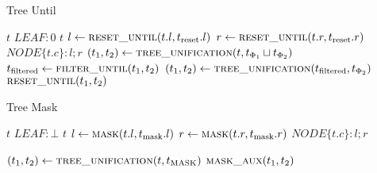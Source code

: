 \documentclass[11pt,a4paper,titlepage]{article}
\begin{document}
\begin{algorithm}                      
    \caption{Tree Until}         
    \label{alg:tree_until}       
    \begin{algorithmic}
                \State \Return $t$
                \State \Return $LEAF: 0$
                \State \Return $t$
            \Else
                \State $l \gets \Call{reset\_until}{t.l, t_{\text{reset}}.l}$
                \State $r \gets \Call{reset\_until}{t.r, t_{\text{reset}}.r}$
                \State \Return $NODE\{t.c \}: l ; r$
            \EndIf 
        \EndFunction
            \State $(t_1, t_2) \gets \Call{tree\_unification}{t, t_{\Phi_1} \sqcup t_{\Phi_2}}$
            \State $t_{\text{filtered}} \gets \Call{filter\_until}{t_1, t_2}$
            \State $(t_1, t_2) \gets \Call{tree\_unification}{t_{\text{filtered}}, t_{\Phi_2}}$
            \State \Return $\Call{reset\_until}{t_1, t_2}$
        \EndFunction
\end{algorithmic}
\end{algorithm}

\begin{algorithm}                      
    \caption{Tree Mask}         
    \label{alg:tree_mask}       
    \begin{algorithmic}

                    \State \Return $t$
                        \State \Return $LEAF: \bot$
                    \Else
                        \State \Return $t$
                    \EndIf
                \Else
                    \State $l \gets \Call{mask}{t.l, t_{\text{mask}}.l}$
                    \State $r \gets \Call{mask}{t.r, t_{\text{mask}}.r}$
                    \State \Return $NODE\{t.c \}: l ; r$
                \EndIf 
            \EndFunction

            \State $(t_1, t_2) \gets \Call{tree\_unification}{t, t_{\text{MASK}}}$
            \State \Return $\Call{mask\_aux}{t_1, t_2}$
        \EndFunction
\end{algorithmic}
\end{algorithm}
\end{document}
